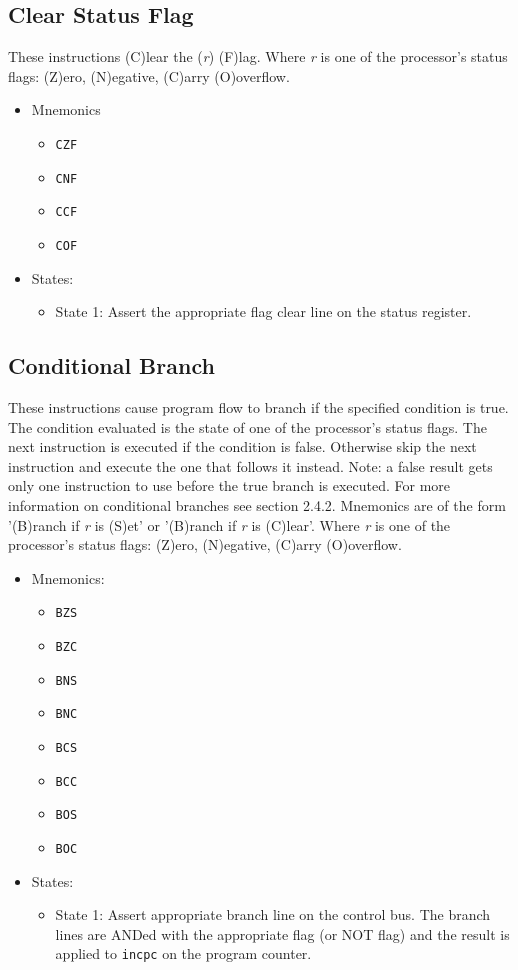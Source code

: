 \documentclass[a4paper,12pt]{article}
\newcommand\rr{\textit{r}}
\begin{document}
\subsection{Clear Status Flag}
These instructions (C)lear the (\rr{}) (F)lag. Where \rr{} is one of the
processor's status flags: (Z)ero, (N)egative, (C)arry (O)overflow.
\par

\begin{itemize}
\item Mnemonics 
\begin{itemize}
	\item \texttt{CZF}
	\item \texttt{CNF}
	\item \texttt{CCF}
	\item \texttt{COF}
\end{itemize}
\item States:
\begin{itemize}
	\item State 1: Assert the appropriate flag clear line on the status
	register.
\end{itemize}
\end{itemize}

\subsection{Conditional Branch}
These instructions cause program flow to branch if the specified condition is
true. The condition evaluated is the state of one of the processor's status
flags. The next instruction is executed if the condition is false. Otherwise
skip the next instruction and execute the one that follows it instead. Note: a
false result gets only one instruction to use before the true branch is executed.
For more information on conditional branches see section 2.4.2. Mnemonics are of
the form '(B)ranch if \rr{} is (S)et' or '(B)ranch if \rr{} is (C)lear'. Where
\rr{} is one of the processor's status flags: (Z)ero, (N)egative, (C)arry
(O)overflow.
\par

\begin{itemize}
\item Mnemonics:
\begin{itemize}
	\item \texttt{BZS}
	\item \texttt{BZC}
	\item \texttt{BNS}
	\item \texttt{BNC}
	\item \texttt{BCS}
	\item \texttt{BCC}
	\item \texttt{BOS}
	\item \texttt{BOC}
\end{itemize}
\item States:
\begin{itemize}
	\item State 1: Assert appropriate branch line on the control bus. The
	branch lines are ANDed with the appropriate flag (or NOT flag) and the
	result is applied to \texttt{incpc} on the program counter.
\end{itemize}
\end{itemize}
\end{document}
